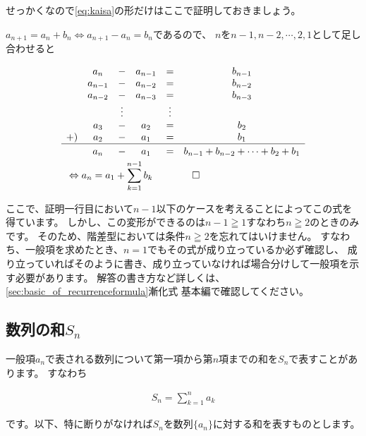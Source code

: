 \documentclass[a4paper]{ltjsarticle}
\begin{document}
せっかくなので\eqref{eq:kaisa}の形だけはここで証明しておきましょう。
\begin{prf*}
$a_{n+1} = a_n + b_n \Leftrightarrow a_{n+1} - a_n = b_n$であるので、
$n$を$n-1,n-2,\cdots,2,1$として足し合わせると

{\newcommand{\dl}[1]{\raisebox{-2pt}{$#1$}}
\begin{fleqn}[20pt]
  \begin{align*}
    &\begin{matrix}
      & a_n     & - & a_{n-1} & = & b_{n-1} \\
      & a_{n-1} & - & a_{n-2} & = & b_{n-2} \\
      & a_{n-2} & - & a_{n-3} & = & b_{n-3} \\
      &       & \vdots &    &\vdots &       \\
      & a_3     & - & a_2     & = & b_2     \\
  +) & a_2     & - & a_1     & = & b_1     \\
  \hline
      & \dl{a_n}     & \dl{-} & \dl{a_1}     & \dl{=} & \dl{b_{n-1} + b_{n-2} + \cdots + b_2 + b_1}
    \end{matrix}
    \\
    &\Leftrightarrow a_n = a_1 + \sum_{k=1}^{n-1}b_k \qquad \qed
  \end{align*}
\end{fleqn}
}
\end{prf*}

ここで、証明一行目において$n-1$以下のケースを考えることによってこの式を得ています。
しかし、この変形ができるのは$n-1\geqq 1$すなわち$n\geqq 2$のときのみです。
そのため、階差型においては条件$n\geqq 2$を忘れてはいけません。
すなわち、一般項を求めたとき、$n=1$でもその式が成り立っているか必ず確認し、
成り立っていればそのように書き、成り立っていなければ場合分けして一般項を示す必要があります。
解答の書き方など詳しくは、\ref*{sec:basic_of_recurrenceformula}漸化式 基本編で確認してください。


\subsection{数列の和$S_n$}
一般項$a_n$で表される数列について第一項から第$n$項までの和を$S_n$で表すことがあります。
すなわち
\begin{fleqn}[20pt]
  \begin{align*}
    S_n = \sum_{k=1}^{n}a_k
  \end{align*}
\end{fleqn}
です。以下、特に断りがなければ$S_n$を数列$\{a_n\}$に対する和を表すものとします。
\end{document}
